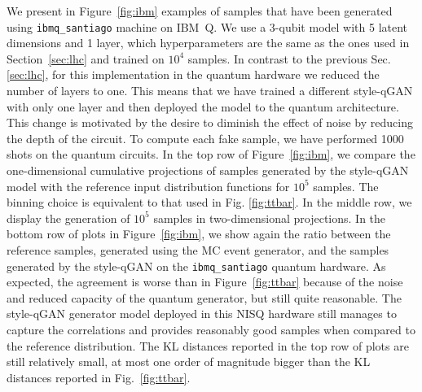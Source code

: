 \documentclass[twocolumn,preprintnumbers,superscriptaddress]{revtex4-2}
\begin{document}
We present in Figure~\ref{fig:ibm} examples of samples that have been generated using {\tt ibmq\_santiago} machine on IBM~Q. We use a 3-qubit model with 5 latent dimensions and 1 layer, which hyperparameters are the same as the ones used in Section~\ref{sec:lhc} and trained on $10^4_{}$ samples. In contrast to the previous Sec. \ref{sec:lhc}, for this implementation in the quantum hardware we reduced the number of layers to one. This means that we have trained a different style-qGAN with only one layer and then deployed the model to the quantum architecture. This change is motivated by the desire to diminish the effect of noise by reducing the depth of the circuit. To compute each fake sample, we have performed 1000 shots on the quantum circuits. In the top row of Figure~\ref{fig:ibm}, we compare the one-dimensional cumulative projections of samples generated by the style-qGAN model with the reference input distribution functions for $10^5$ samples. The binning choice is equivalent to that used in Fig. \ref{fig:ttbar}. In the middle row, we display the generation of $10^5$ samples in two-dimensional projections. In the bottom row of plots in Figure~\ref{fig:ibm}, we show again the ratio between the reference samples, generated using the MC event generator, and the samples generated by the style-qGAN on the {\tt ibmq\_santiago} quantum hardware. As expected, the agreement is worse than in Figure~\ref{fig:ttbar} because of the noise and reduced capacity of the quantum generator, but still quite reasonable. The style-qGAN generator model deployed in this NISQ hardware still manages to capture the correlations and provides reasonably good samples when compared to the reference distribution. The  KL distances reported in the top row of plots are still relatively small, at most one order of magnitude bigger than the KL distances reported in Fig.~\ref{fig:ttbar}.
\end{document}
